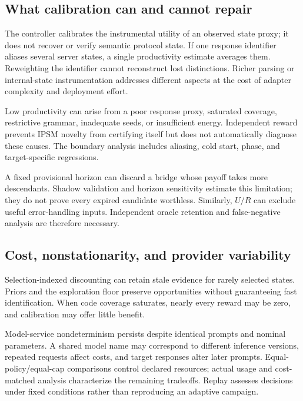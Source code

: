 \documentclass[final,5p,times,number]{elsarticle}
\begin{document}
\subsection{What calibration can and cannot repair}
The controller calibrates the instrumental utility of an observed state proxy; it does not recover or verify semantic protocol state. If one response identifier aliases several server states, a single productivity estimate averages them. Reweighting the identifier cannot reconstruct lost distinctions. Richer parsing or internal-state instrumentation addresses different aspects at the cost of adapter complexity and deployment effort.

Low productivity can arise from a poor response proxy, saturated coverage, restrictive grammar, inadequate seeds, or insufficient energy. Independent reward prevents IPSM novelty from certifying itself but does not automatically diagnose these causes. The boundary analysis includes aliasing, cold start, phase, and target-specific regressions.

A fixed provisional horizon can discard a bridge whose payoff takes more descendants. Shadow validation and horizon sensitivity estimate this limitation; they do not prove every expired candidate worthless. Similarly, $U/R$ can exclude useful error-handling inputs. Independent oracle retention and false-negative analysis are therefore necessary.

\subsection{Cost, nonstationarity, and provider variability}
Selection-indexed discounting can retain stale evidence for rarely selected states. Priors and the exploration floor preserve opportunities without guaranteeing fast identification. When code coverage saturates, nearly every reward may be zero, and calibration may offer little benefit.

Model-service nondeterminism persists despite identical prompts and nominal parameters. A shared model name may correspond to different inference versions, repeated requests affect costs, and target responses alter later prompts. Equal-policy/equal-cap comparisons control declared resources; actual usage and cost-matched analysis characterize the remaining tradeoffs. Replay assesses decisions under fixed conditions rather than reproducing an adaptive campaign.
\end{document}
